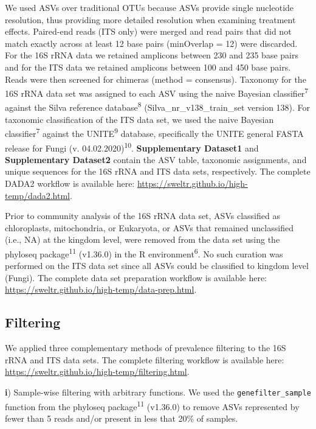 \documentclass[
  10pt,
  letterpaper,
  DIV=11,
  numbers=noendperiod]{scrartcl}
\begin{document}
We used ASVs over traditional OTUs because ASVs provide single
nucleotide resolution, thus providing more detailed resolution when
examining treatment effects. Paired-end reads (ITS only) were merged and
read pairs that did not match exactly across at least 12 base pairs
(minOverlap = 12) were discarded. For the 16S rRNA data we retained
amplicons between 230 and 235 base pairs and for the ITS data we
retained amplicons between 100 and 450 base pairs. Reads were then
screened for chimeras (method = consensus). Taxonomy for the 16S rRNA
data set was assigned to each ASV using the naive Bayesian
classifier\textsuperscript{7} against the Silva reference
database\textsuperscript{8} (Silva\_nr\_v138\_train\_set version 138).
For taxonomic classification of the ITS data set, we used the naive
Bayesian classifier\textsuperscript{7} against the
UNITE\textsuperscript{9} database, specifically the UNITE general FASTA
release for Fungi (v. 04.02.2020)\textsuperscript{10}.
\textbf{Supplementary Dataset1} and \textbf{Supplementary Dataset2}
contain the ASV table, taxonomic assignments, and unique sequences for
the 16S rRNA and ITS data sets, respectively. The complete DADA2
workflow is available here:
\url{https://sweltr.github.io/high-temp/dada2.html}.

Prior to community analysis of the 16S rRNA data set, ASVs classified as
chloroplasts, mitochondria, or Eukaryota, or ASVs that remained
unclassified (i.e., NA) at the kingdom level, were removed from the data
set using the phyloseq package\textsuperscript{11} (v1.36.0) in the R
environment\textsuperscript{6}. No such curation was performed on the
ITS data set since all ASVs could be classified to kingdom level
(Fungi). The complete data set preparation workflow is available here:
\url{https://sweltr.github.io/high-temp/data-prep.html}.

\hypertarget{filtering}{%
\subsection{Filtering}\label{filtering}}

We applied three complementary methods of prevalence filtering to the
16S rRNA and ITS data sets. The complete filtering workflow is available
here: \url{https://sweltr.github.io/high-temp/filtering.html}.

\textbf{i}) Sample-wise filtering with arbitrary functions. We used the
\texttt{genefilter\_sample} function from the phyloseq
package\textsuperscript{11} (v1.36.0) to remove ASVs represented by
fewer than 5 reads and/or present in less that 20\% of samples.
\end{document}
